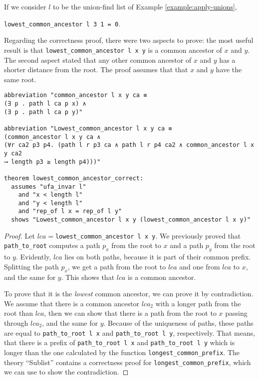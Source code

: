 \begin{exmp}
If we consider $l$ to be the union-find list of Example \ref{example:apply-unions},

\lstinline|lowest_common_ancestor l 3 1 = 0|.
\end{exmp}

Regarding the correctness proof, there were two aspects to prove: the most useful result is that \lstinline{lowest_common_ancestor l x y} is a common ancestor of $x$ and $y$. The second aspect stated that any other common ancestor of $x$ and $y$ has a shorter distance from the root. The proof assumes that that $x$ and $y$ have the same root.

\begin{lstlisting}
abbreviation "common_ancestor l x y ca ≡
(∃ p . path l ca p x) ∧
(∃ p . path l ca p y)"

abbreviation "Lowest_common_ancestor l x y ca ≡
(common_ancestor l x y ca ∧
(∀r ca2 p3 p4. (path l r p3 ca ∧ path l r p4 ca2 ∧ common_ancestor l x y ca2
⟶ length p3 ≥ length p4)))"

theorem lowest_common_ancestor_correct:
  assumes "ufa_invar l"
    and "x < length l"
    and "y < length l"
    and "rep_of l x = rep_of l y"
  shows "Lowest_common_ancestor l x y (lowest_common_ancestor l x y)"
\end{lstlisting}

\begin{proof}
Let $lca =$\lstinline{lowest_common_ancestor l x y}. We previously proved that \lstinline{path_to_root} computes a path $p_x$ from the root to $x$ and a path $p_y$ from the root to $y$. Evidently, $lca$ lies on both paths, because it is part of their common prefix. Splitting the path $p_x$, we get a path from the root to $lca$ and one from $lca$ to $x$, and the same for $y$. This shows that $lca$ is a common ancestor.

To prove that it is the \emph{lowest} common ancestor, we can prove it by contradiction. We assume that there is a common ancestor $lca_2$ with a longer path from the root than $lca$, then we can show that there is a path from the root to $x$ passing through $lca_2$, and the same for $y$. Because of the uniqueness of paths, these paths are equal to \lstinline{path_to_root l x} and \lstinline{path_to_root l y}, respectively. That means, that there is a prefix of \lstinline{path_to_root l x} and \lstinline{path_to_root l y} which is longer than the one calculated by the function \lstinline{longest_common_prefix}. The theory ``Sublist'' contains a correctness proof for \lstinline{longest_common_prefix}, which we can use to show the contradiction.
\end{proof}

